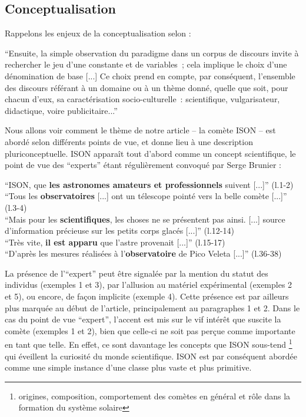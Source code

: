 \documentclass[a4paper,10pt]{article}
\begin{document}
		\subsection{Conceptualisation}
			Rappelons les enjeux de la conceptualisation selon \cite{Mortureux1993} :
			\begin{center}
				\footnotesize
				\begin{minipage}{0.7\textwidth}
					``Ensuite, la simple observation du paradigme dans un corpus de discours invite à rechercher le jeu d'une constante et de variables ; cela implique le choix d'une dénomination de base [...] Ce choix prend en compte, par conséquent, l'ensemble des discours référant à un domaine ou à un thème donné, quelle que soit, pour chacun d'eux, sa caractérisation socio-culturelle : scientifique, vulgarisateur, didactique, voire publicitaire...'' 
				\end{minipage}
			\end{center}
			Nous allons voir comment le thème de notre article -- la comète ISON -- est abordé selon différents points de vue, et donne lieu à une description pluriconceptuelle. ISON apparaît tout d'abord comme un concept scientifique, le point de vue des ``experts'' étant régulièrement convoqué par Serge Brunier :
			\begin{center}
				\footnotesize
				\begin{minipage}{0.7\textwidth}
					``ISON, que \textbf{les astronomes amateurs et professionnels} suivent [...]'' (l.1-2)\\
					``Tous les \textbf{observatoires} [...] ont un télescope pointé vers la belle comète [...]'' (l.3-4)\\
					``Mais pour les \textbf{scientifiques}, les choses ne se présentent pas ainsi. [...] source d'information précieuse sur les petits corps glacés [...]'' (l.12-14) \\
					``Très vite, \textbf{il est apparu} que l'astre provenait [...]'' (l.15-17)\\
					``D'après les mesures réalisées à l'\textbf{observatoire} de Pico Veleta [...]'' (l.36-38)
				\end{minipage}
			\end{center}
			La présence de l'``expert'' peut être signalée par la mention du statut des individus (exemples 1 et 3), par l'allusion au matériel expérimental (exemples 2 et 5), ou encore, de façon implicite (exemple 4). Cette présence est par ailleurs plus marquée au début de l'article, principalement au paragraphes 1 et 2. Dans le cas du point de vue ``expert'', l'accent est mis sur le vif intérêt que suscite la comète (exemples 1 et 2), bien que celle-ci ne soit pas perçue comme importante en tant que telle. En effet, ce sont davantage les concepts que ISON sous-tend \footnote{origines, composition, comportement des comètes en général et rôle dans la formation du système solaire} qui éveillent la curiosité du monde scientifique. ISON est par conséquent abordée comme une simple instance d'une classe plus vaste et plus primitive.\\
			
\end{document}
